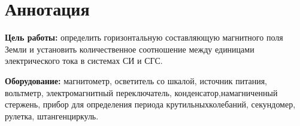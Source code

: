 \section{Аннотация}
\textbf{Цель работы:}  определить горизонтальную составляющую магнитного поля Земли и установить количественное соотношение между единицами электрического тока в системах СИ и СГС.

\textbf{Оборудование:}  магнитометр, осветитель со шкалой, источник питания, вольтметр, электромагнитный переключатель, конденсатор,намагниченный стержень, прибор для определения периода крутильныхколебаний, секундомер, рулетка, штангенциркуль.
